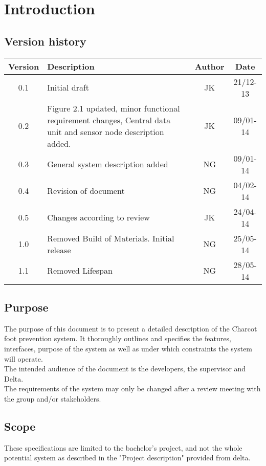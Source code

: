 \chapter{Introduction}
\section{Version history}
\begin{table}[H]
\begin{tabular}{|c|p{9cm}|c|c|}
\hline
Version & Description & Author & Date\\
\hline
0.1 & Initial draft & JK & 21/12-13\\
\hline
0.2 & Figure 2.1 updated, minor functional requirement changes, Central data unit and sensor node description added. & JK & 09/01-14\\
\hline
0.3 & General system description added & NG & 09/01-14\\
\hline
0.4 & Revision of document & NG & 04/02-14\\
\hline
0.5 & Changes according to review & JK & 24/04-14\\
\hline
1.0 & Removed Build of Materials. Initial release & NG & 25/05-14\\
\hline
1.1 & Removed Lifespan & NG & 28/05-14\\
\end{tabular}
\end{table}

\section{Purpose}
The purpose of this document is to present a detailed description of the Charcot foot prevention system. It thoroughly outlines and specifies the features, interfaces, purpose of the system as well as under which constraints the system will operate.\\
The intended audience of the document is the developers, the supervisor and Delta.\\
The requirements of the system may only be changed after a review meeting with the group and/or stakeholders.\\

\section{Scope}
These specifications are limited to the bachelor's project, and not the whole potential system as described in the "Project description" provided from delta.\\


